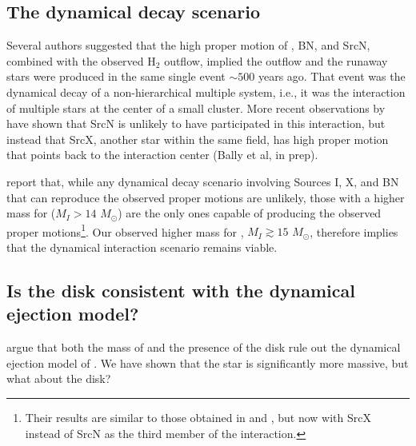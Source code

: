 \documentclass[twocolumn]{aastex61}
\newcommand{\msun}{\ensuremath{M_{\odot}}\xspace}			%
\newcommand{\hh}{\ensuremath{\textrm{H}_{2}}\xspace}			%
\newcommand{\sourcen}{SrcN\xspace}
\newcommand{\sourcex}{SrcX\xspace}
\begin{document}
\subsection{The dynamical decay scenario}
Several authors \citep[][]{Gomez2008a,Goddi2011b,Bally2011a} suggested that
the high proper
motion of \sourcei, BN, and \sourcen, combined with the observed \hh outflow,
implied the outflow and the runaway stars were produced in the same single
event $\sim500$ years ago.  That event was the dynamical decay of a
non-hierarchical multiple system, i.e., it was the interaction of multiple
stars at the center of a small cluster.  More recent observations by
\citet{Luhman2017a} have shown that \sourcen is unlikely to have participated
in this interaction, but instead that \sourcex, another star within the same
field, has high proper motion that points back to the interaction center (Bally et al,
in prep).

\citet{Farias2017b} report that, while any dynamical decay scenario involving
Sources I, X, and BN that can reproduce the observed proper motions are
unlikely, those with a higher mass for \sourcei ($M_I>14$ \msun) are the only
ones capable of producing the observed proper motions\footnote{Their results
are similar to those obtained in \citet{Goddi2011b} and \citet{Moeckel2012b},
but now with \sourcex instead of \sourcen as the third member of the
interaction.}.  Our observed higher mass for \sourcei, $M_I\gtrsim15$ \msun,
therefore implies that the
dynamical interaction scenario remains viable.



\subsection{Is the disk consistent with the dynamical ejection model?}
\citet{Plambeck2016a} argue that both the mass of \sourcei and the presence of
the disk rule out the dynamical ejection model of \citet{Bally2011a}.  We have
shown that the star is significantly more massive, but what about the disk?
\end{document}

